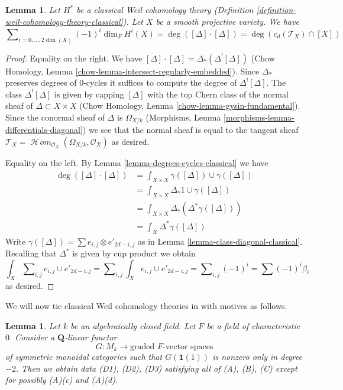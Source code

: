 \documentclass{stacks-project}
\theoremstyle{plain}
\newtheorem{lemma}[subsection]{Lemma}
\theoremstyle{definition}
\theoremstyle{remark}
\numberwithin{equation}{subsection}
\def\SheafHom{\mathop{\mathcal{H}\!\mathit{om}}\nolimits}
\begin{document}
\begin{lemma}
\label{lemma-square-diagonal-classical}
Let $H^*$ be a classical Weil cohomology theory
(Definition \ref{definition-weil-cohomology-theory-classical}).
Let $X$ be a smooth projective variety. We have
$$
\sum\nolimits_{i = 0, \ldots, 2\dim(X)} (-1)^i\dim_F H^i(X) =
\deg([\Delta] \cdot [\Delta]) = \deg(c_d(\mathcal{T}_X) \cap [X])
$$
\end{lemma}

\begin{proof}
Equality on the right. We have
$[\Delta] \cdot [\Delta] = \Delta_*(\Delta^![\Delta])$
(Chow Homology, Lemma \ref{chow-lemma-intersect-regularly-embedded}).
Since $\Delta_*$ preserves degrees of $0$-cycles it suffices to compute
the degree of $\Delta^![\Delta]$. The class $\Delta^![\Delta]$ is given
by capping $[\Delta]$ with
the top Chern class of the normal sheaf of $\Delta \subset X \times X$
(Chow Homology, Lemma \ref{chow-lemma-gysin-fundamental}).
Since the conormal sheaf of $\Delta$ is $\Omega_{X/k}$
(Morphisms, Lemma \ref{morphisms-lemma-differentials-diagonal})
we see that the normal sheaf is equal to the tangent sheaf
$\mathcal{T}_X = \SheafHom_{\mathcal{O}_X}(\Omega_{X/k}, \mathcal{O}_X)$
as desired.

\medskip\noindent
Equality on the left. By Lemma \ref{lemma-degrees-cycles-classical} we have
\begin{align*}
\deg([\Delta] \cdot [\Delta])
& =
\int_{X \times X} \gamma([\Delta]) \cup \gamma([\Delta]) \\
& =
\int_{X \times X} \Delta_*1 \cup \gamma([\Delta]) \\
& =
\int_{X \times X} \Delta_*(\Delta^*\gamma([\Delta])) \\
& =
\int_X \Delta^*\gamma([\Delta])
\end{align*}
Write $\gamma([\Delta]) = \sum  e_{i, j} \otimes e'_{2d - i , j}$
as in Lemma \ref{lemma-class-diagonal-classical}.
Recalling that $\Delta^*$ is given by cup product we obtain
$$
\int_X \sum\nolimits_{i, j} e_{i, j} \cup e'_{2d - i, j} =
\sum\nolimits_{i, j} \int_X e_{i, j} \cup e'_{2d - i, j} =
\sum\nolimits_{i, j} (-1)^i = \sum (-1)^i\beta_i
$$
as desired.
\end{proof}




\noindent
We will now tie classical Weil cohomology theories in with motives as follows.

\begin{lemma}
\label{lemma-from-functor-to-weil-classical}
Let $k$ be an algebraically closed field. Let $F$ be a field of
characteristic $0$. Consider a $\mathbf{Q}$-linear functor
$$
G : M_k \longrightarrow \text{graded }F\text{-vector spaces}
$$
of symmetric monoidal categories such that $G(\mathbf{1}(1))$
is nonzero only in degree $-2$. Then we obtain data (D1), (D2), (D3)
satisfying all of (A), (B), (C) except for possibly (A)(c) and (A)(d).
\end{lemma}
\end{document}
